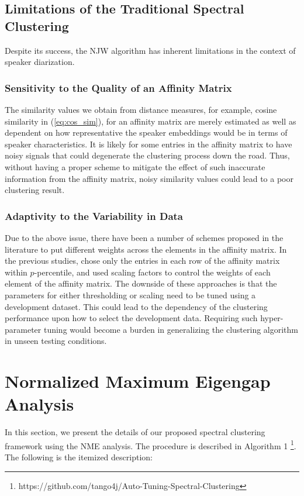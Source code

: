 \documentclass[journal]{IEEEtran}
\begin{document}
\subsection{Limitations of the Traditional Spectral Clustering}

Despite its success, the NJW algorithm has inherent limitations in the context of speaker diarization. 
\subsubsection{Sensitivity to the Quality of an Affinity Matrix} 
The similarity values we obtain from distance measures, for example, cosine similarity in (\ref{eq:cos_sim}), for an affinity matrix are merely estimated as well as dependent on how representative the speaker embeddings would be in terms of speaker characteristics. It is likely for some entries in the affinity matrix to have noisy signals that could degenerate the clustering process down the road. Thus, without having a proper scheme to mitigate the effect of such inaccurate information from the affinity matrix, noisy similarity values could lead to a poor clustering result.

\subsubsection{Adaptivity to the Variability in Data} Due to the above issue, there have been a number of schemes proposed in the literature to put different weights across the elements in the affinity matrix. In the previous studies, \cite{wang2018speaker} chose only the entries in each row of the affinity matrix within $p$-percentile, and \cite{ning2006spectral, shum2012use} used scaling factors to control the weights of each element of the affinity matrix. The downside of these approaches is that the parameters for either thresholding or scaling need to be tuned using a development dataset. This could lead to the dependency of the clustering performance upon how to select the development data. Requiring such hyper-parameter tuning would become a burden in generalizing the clustering algorithm in unseen testing conditions. 
\vspace{-1.0ex}
\section{Normalized Maximum Eigengap Analysis} 
In this section, we present the details of our proposed spectral clustering framework using the NME analysis. The procedure is described in Algorithm 1 \footnote{https://github.com/tango4j/Auto-Tuning-Spectral-Clustering}. The following is the itemized description:
\end{document}
